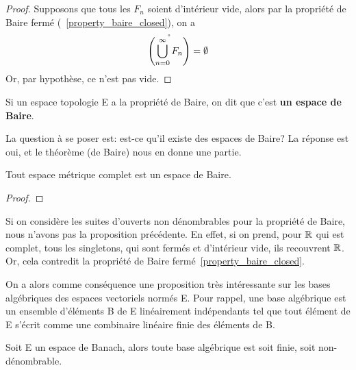 \ifdefined\outputproof
\begin{proof}
	Supposons que tous les $F_{n}$ soient d'intérieur vide, alors par la
	propriété de Baire fermé (~\ref{property_baire_closed}), on a
	\begin{equation}
		\mathring{\left(\bigcup_{n = 0}^{\infty}{F_{n}} \right)} = \emptyset
	\end{equation}
	Or, par hypothèse, ce n'est pas vide.
\end{proof}
\fi

\begin{definition} 
\label{definition_baire_space}
	Si un espace topologie E a la propriété de Baire, on dit que c'est \textbf{un espace
	de Baire}.
\end{definition}

La question à se poser est: est-ce qu'il existe des espaces de Baire? La
réponse est oui, et le théorème (de Baire) nous en donne une partie.

\begin{theorem} 
\label{theorem_baire_complete_space}
	Tout espace métrique complet est un espace de Baire.
\end{theorem}

\ifdefined\outputproof
\begin{proof}

\end{proof}
\fi

\begin{remarque}
	Si on considère les suites d'ouverts non dénombrables pour la propriété de
	Baire, nous n'avons pas la proposition précédente.
	En effet, si on prend, pour $\mathbb{R}$ qui est complet, tous les singletons,
	qui sont fermés et d'intérieur vide, ils recouvrent $\mathbb{R}$. Or, cela
	contredit la propriété de Baire fermé~\ref{property_baire_closed}.
\end{remarque}

On a alors comme conséquence une proposition très intéressante sur les bases
algébriques des espaces vectoriels normés E. Pour rappel, une base algébrique
est un ensemble d'éléments B de E linéairement indépendants tel que tout élément
de E s'écrit comme une combinaire linéaire finie des éléments de B.

\begin{proposition}
\label{proposition_basis_banach_space}
	Soit E un espace de Banach, alors toute base algébrique est soit finie, soit
	non-dénombrable.
\end{proposition}

